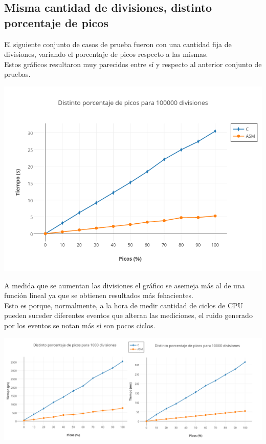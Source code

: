 \newpage

\subsection{Misma cantidad de divisiones, distinto porcentaje de picos}

El siguiente conjunto de casos de prueba fueron con una cantidad fija de divisiones, variando el porcentaje de picos respecto a las mismas.\\

Estos gráficos resultaron muy parecidos entre sí y respecto al anterior conjunto de pruebas. 

\includegraphics[scale=0.6]{imagenes/distintosPicos100000divisiones.png} 

A medida que se aumentan las divisiones el gráfico se asemeja más al de una función lineal ya que se obtienen resultados más fehacientes.\\

Esto es porque, normalmente, a la hora de medir cantidad de ciclos de CPU pueden suceder diferentes eventos que alteran las mediciones, el ruido generado por los eventos se notan más si son pocos ciclos.

\centerline{\includegraphics[scale=0.45]{imagenes/distintosPicosParaDivisiones.png}}

